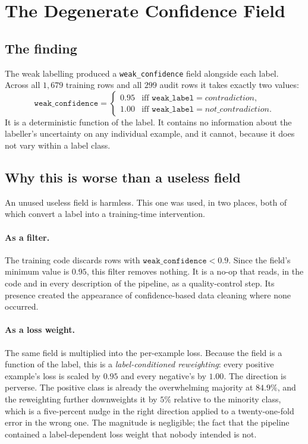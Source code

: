 \section{The Degenerate Confidence Field}
\label{sec:weak-confidence}

\subsection{The finding}

The weak labelling produced a \texttt{weak\_confidence} field alongside each
label. Across all $1{,}679$ training rows and all $299$ audit rows it takes
exactly two values:
\[
\texttt{weak\_confidence} =
\begin{cases}
0.95 & \text{iff } \texttt{weak\_label} = \textit{contradiction},\\
1.00 & \text{iff } \texttt{weak\_label} = \textit{not\_contradiction}.
\end{cases}
\]
It is a deterministic function of the label. It contains no information about
the labeller's uncertainty on any individual example, and it cannot, because it
does not vary within a label class.

\subsection{Why this is worse than a useless field}

An unused useless field is harmless. This one was used, in two places, both of
which convert a label into a training-time intervention.

\paragraph{As a filter.} The training code discards rows with
$\texttt{weak\_confidence} < 0.9$. Since the field's minimum value is $0.95$,
this filter removes nothing. It is a no-op that reads, in the code and in every
description of the pipeline, as a quality-control step. Its presence created the
appearance of confidence-based data cleaning where none occurred.

\paragraph{As a loss weight.} The same field is multiplied into the per-example
loss. Because the field is a function of the label, this is a
\emph{label-conditioned reweighting}: every positive example's loss is scaled by
$0.95$ and every negative's by $1.00$. The direction is perverse. The positive
class is already the overwhelming majority at $84.9\%$, and the reweighting
further downweights it by $5\%$ relative to the minority class, which is a
five-percent nudge in the right direction applied to a twenty-one-fold error in
the wrong one. The magnitude is negligible; the fact that the pipeline contained
a label-dependent loss weight that nobody intended is not.

